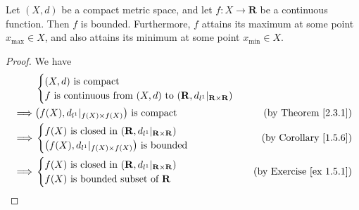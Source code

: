 \begin{proposition}\label{2.3.2}
    Let \((X, d)\) be a compact metric space, and let \(f : X \to \mathbf{R}\) be a continuous function.
    Then \(f\) is bounded.
    Furthermore, \(f\) attains its maximum at some point \(x_{\max} \in X\), and also attains its minimum at some point \(x_{\min} \in X\).
\end{proposition}

\begin{proof}
    We have
    \begin{align*}
                 & \begin{cases}
            (X, d) \text{ is compact} \\
            f \text{ is continuous from } (X, d) \text{ to } (\mathbf{R}, d_{l^1}|_{\mathbf{R} \times \mathbf{R}})
        \end{cases}                                                                            \\
        \implies & \big(f(X), d_{l^1}|_{f(X) \times f(X)}\big) \text{ is compact} & \text{(by Theorem \ref{2.3.1})}     \\
        \implies & \begin{cases}
            f(X) \text{ is closed in } (\mathbf{R}, d_{l^1}|_{\mathbf{R} \times \mathbf{R}}) \\
            \big(f(X), d_{l^1}|_{f(X) \times f(X)}\big) \text{ is bounded}
        \end{cases}                                      & \text{(by Corollary \ref{1.5.6})}   \\
        \implies & \begin{cases}
            f(X) \text{ is closed in } (\mathbf{R}, d_{l^1}|_{\mathbf{R} \times \mathbf{R}}) \\
            f(X) \text{ is bounded subset of } \mathbf{R}
        \end{cases}                                      & \text{(by Exercise \ref{ex 1.5.1})}
    \end{align*}


\end{proof}
